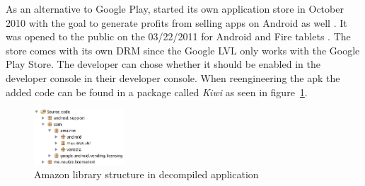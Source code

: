 As an alternative to Google Play, started its own application store in October 2010 with the goal to generate profits from selling apps on Android as well \cite{amazonBeta}.
It was opened to the public on the 03/22/2011 for Android and Fire tablets \cite{amazonRelease}.
The store comes with its own DRM since the Google LVL only works with the Google Play Store.
The developer can chose whether it should be enabled in the developer console  in their developer console.
When reengineering the \gls{apk} the added code can be found in a package called \textit{Kiwi} as seen in figure~\ref{fig:amazonFolder}. \cite{amazonDeveloper}
\begin{figure}[h]
    \centering
    \includegraphics[width=0.3\textwidth]{data/amazonFolder.png}
    \caption{Amazon library structure in decompiled application}
    \label{fig:amazonFolder}
\end{figure}
